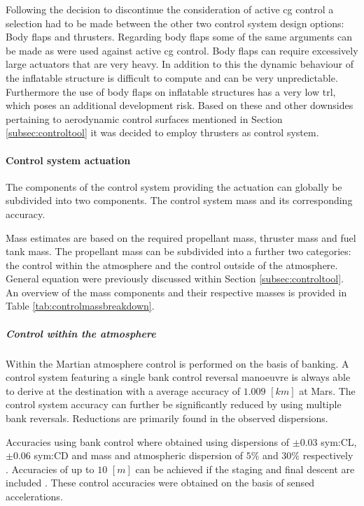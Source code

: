 Following the decision to discontinue the consideration of active \gls{cg} control a selection had to be made between the other two control system design options: Body flaps and thrusters. Regarding body flaps some of the same arguments can be made as were used against active \gls{cg} control. Body flaps can require excessively large actuators that are very heavy. In addition to this the dynamic behaviour of the inflatable structure is difficult to compute and can be very unpredictable. Furthermore the use of body flaps on inflatable structures has a very low \gls{trl}, which poses an additional development risk. Based on these and other downsides pertaining to aerodynamic control surfaces mentioned in Section \ref{subsec:controltool} it was decided to employ thrusters as control system.

\paragraph{Control system actuation}

The components of the control system providing the actuation can globally be subdivided into two components. The control system mass and its corresponding accuracy.

Mass estimates are based on the required propellant mass, thruster mass and fuel tank mass. The propellant mass can be subdivided into a further two categories: the control within the atmosphere and the control outside of the atmosphere. General equation were previously discussed within Section \ref{subsec:controltool}. An overview of the mass components and their respective masses is provided in Table \ref{tab:controlmassbreakdown}.

\subparagraph{Control within the atmosphere} 

Within the Martian atmosphere control is performed on the basis of banking. A control system featuring a single bank control reversal manoeuvre is always able to derive at the destination with a average accuracy of $1.009$ $[km]$ at Mars\cite{Lu2007}. The control system accuracy can further be significantly reduced by using multiple bank reversals. Reductions are primarily found in the observed dispersions.

Accuracies using bank control where obtained using dispersions of $\pm 0.03 $ \gls{sym:CL}, $\pm 0.06 $ \gls{sym:CD} and mass and atmospheric dispersion of $5\%$ and $30\%$ respectively \cite{Lu2007}. Accuracies of up to $10$ $[m]$ can be achieved if the staging and final descent are included \cite{Davis2010}. These control accuracies were obtained on the basis of sensed accelerations.

